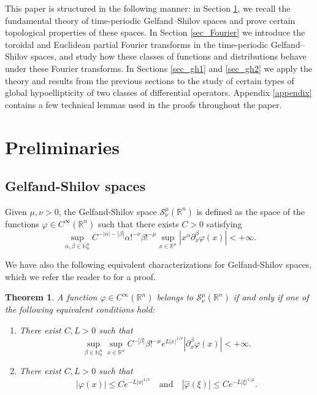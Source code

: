 \documentclass[11pt,reqno]{amsart}
\newtheorem{theorem}{Theorem}[section]
\numberwithin{equation}{section}
\theoremstyle{definition}
\theoremstyle{definition}
\newcommand{\R}{\mathbb{R}}
\newcommand{\N}{\mathbb{N}}
\begin{document}
This paper is structured in the following manner:  in Section \ref{sec_prelim}, we recall the fundamental theory of time-periodic Gelfand–Shilov spaces and prove certain  topological properties of these spaces. In Section \ref{sec_Fourier} we introduce the toroidal and Euclidean partial Fourier transforms in the time-periodic Gelfand–Shilov spaces, and study how these classes of functions and distributions behave under these Fourier transforms. In Sections \ref{sec_gh1} and \ref{sec_gh2} we apply the theory and results from the previous sections to the study of certain types of global hypoellipticity of two classes of differential operators. Appendix \ref{appendix} contains a few technical lemmas used in the proofs throughout the paper.

\section{Preliminaries}\label{sec_prelim}

\subsection{Gelfand-Shilov spaces}

Given $\mu,\nu>0$, the Gelfand-Shilov space $\mathcal{S}_{\nu}^{\mu}(\R^n)$ is defined as the space of the functions $\varphi\in C^\infty(\R^n)$ such that there exists $C>0$ satisfying
\[\sup_{\alpha,\beta\in\N_0^n}C^{-|\alpha|-|\beta|}\alpha!^{-\nu}\beta!^{-\mu}\sup_{x\in\R^n}|x^\alpha\partial_x^\beta \varphi(x)|<+\infty.\]

We have also the following equivalent characterizations for Gelfand-Shilov spaces, which we refer the reader to \cite[Theorem 6.1.6 and Proposition 6.1.7]{NicRod} for a proof.

\begin{theorem}\label{gelf_equiv}
	A function $\varphi\in C^\infty(\R^n)$ belongs to $\mathcal{S}_{\nu}^{\mu}(\R^n)$ if and only if one of the following equivalent conditions hold:
	\begin{enumerate}
		\item There exist $C,L>0$ such that
		\begin{equation*}\label{gelf_2}
			\sup_{\beta\in\N_0^n}\sup_{x\in\R^n} C^{-|\beta|}\beta!^{-\mu}e^{L|x|^{1/\nu}}|\partial_x^\beta \varphi(x)|<+\infty.
		\end{equation*}
        \item There exist $C,L>0$ such that
		\begin{equation*}\label{gelf_1}
			|\varphi(x)|\leq Ce^{-L|x|^{1/\nu}}\quad\text{and}\quad |\widehat{\varphi}(\xi)|\leq Ce^{-L|\xi|^{1/\mu}}.
		\end{equation*}
	\end{enumerate}
\end{theorem}
\end{document}
